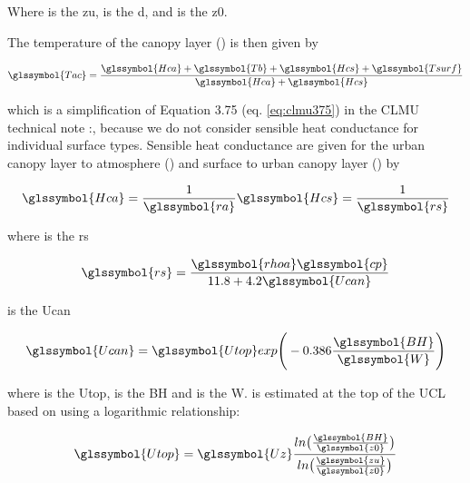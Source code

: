 \documentclass[final,3p,times,authoryear]{elsarticle}
\begin{document}
Where  is the \glsdesc{zu},  is the \glsdesc{d}, and  is the \glsdesc{z0}. 


The temperature of the canopy layer () is then given by \citep{Oleson2010} 

\begin{equation} 
\glssymbol{Tac} = \frac{\glssymbol{Hca} + \glssymbol{Tb} + \glssymbol{Hcs} + \glssymbol{Tsurf} }  { \glssymbol{Hca}  + \glssymbol{Hcs} }
\label{eq:tac} \end{equation}

which is a simplification of Equation 3.75 (eq. \ref{eq:clmu375}) in the CLMU technical note \citep{Oleson2010}:, because we do not consider sensible heat conductance for individual surface types. Sensible heat conductance are given for the urban canopy layer to atmosphere () and surface to urban canopy layer () by \citep{Oleson2010}



\begin{equation} 
\glssymbol{Hca} = \frac{1}{\glssymbol{ra}} \glssymbol{Hcs} = \frac{1}{\glssymbol{rs}}
\label{eq:hca} \end{equation}

where  is the \glsdesc{rs}

\begin{equation} 
\glssymbol{rs} = \frac{\glssymbol{rhoa}\glssymbol{cp}}{11.8+4.2\glssymbol{Ucan}}
\label{eq:rs} \end{equation}
 				
 is the \glsdesc{Ucan}


\begin{equation} 
\glssymbol{Ucan} = \glssymbol{Utop} exp{ \Bigg( -0.386 \frac{\glssymbol{BH}}{\glssymbol{W}} \Bigg)}
\label{eq:ucan} \end{equation}

where  is the \glsdesc{Utop},  is the \glsdesc{BH} and  is the \glsdesc{W}.  is estimated at the top of the UCL based on  using a logarithmic relationship:




\begin{equation} 
\glssymbol{Utop} = \glssymbol{Uz} \frac{ ln \big( \frac{\glssymbol{BH}}{\glssymbol{z0}}  \big)}{ ln \big( \frac{\glssymbol{zu}}{\glssymbol{z0}}  \big) }
\label{eq:xx4} \end{equation}
\end{document}
